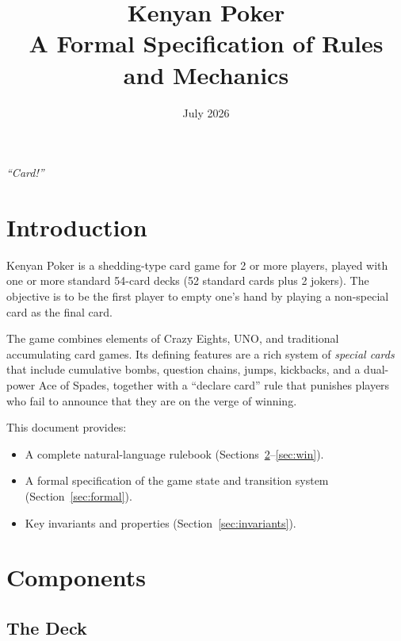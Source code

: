\documentclass[11pt,a4paper,twoside]{article}
\title{\textbf{Kenyan Poker}\\[4pt]
\large A Formal Specification of Rules and Mechanics}
\author{}
\date{July 2026}
\theoremstyle{definition}
\theoremstyle{remark}
\begin{document}
\maketitle
\thispagestyle{empty}
\vspace{2cm}
\begin{center}
\emph{``Card!''}
\end{center}
\newpage

\section{Introduction}

Kenyan Poker is a shedding-type card game for 2 or more players, played with
one or more standard 54-card decks (52 standard cards plus 2 jokers). The
objective is to be the first player to empty one's hand by playing a
non-special card as the final card.

The game combines elements of Crazy Eights, UNO, and traditional accumulating
card games. Its defining features are a rich system of \emph{special cards}
that include cumulative bombs, question chains, jumps, kickbacks, and a
dual-power Ace of Spades, together with a ``declare card'' rule that punishes
players who fail to announce that they are on the verge of winning.

This document provides:
\begin{itemize}[nosep]
  \item A complete natural-language rulebook (Sections~\ref{sec:components}--\ref{sec:win}).
  \item A formal specification of the game state and transition system (Section~\ref{sec:formal}).
  \item Key invariants and properties (Section~\ref{sec:invariants}).
\end{itemize}

\section{Components}
\label{sec:components}

\subsection{The Deck}
\end{document}
